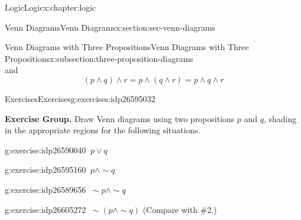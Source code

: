 \documentclass[twoside,10pt,]{book}
\numberwithin{equation}{section}
\begin{document}
\begin{chapterptx}{Logic}{}{Logic}{}{}{x:chapter:logic}
\begin{sectionptx}{Venn Diagrams}{}{Venn Diagrams}{}{}{x:section:sec-venn-diagrams}
\begin{subsectionptx}{Venn Diagrams with Three Propositions}{}{Venn Diagrams with Three Propositions}{}{}{x:subsection:three-proposition-diagrams}
\begin{equation*}
\end{equation*}
and%
\begin{equation*}
(p{\wedge} q){\wedge} r=p{\wedge}(q{\wedge} r)=p{\wedge} q{\wedge} r
\end{equation*}
%
\par
\begin{sidebyside}{2}{0.1}{0.1}{0}%
\begin{sbspanel}{0.4}%
%
\end{sbspanel}%
\begin{sbspanel}{0.4}%
%
\end{sbspanel}%
\end{sidebyside}%
%
\end{subsectionptx}
%
%
\typeout{************************************************}
\typeout{************************************************}
%
\begin{exercises-subsection}{Exercises}{}{Exercises}{}{}{g:exercises:idp26595032}
\par\medskip\noindent%
\textbf{Exercise Group.}\space\space%
Draw Venn diagrams using two propositions \(p\) and \(q\), shading in the appropriate regions for the following situations.\begin{exercisegroup}
\begin{divisionexerciseeg}{1}{}{}{g:exercise:idp26590040}%
\(\ p{\vee} q\)\end{divisionexerciseeg}%
\begin{divisionexerciseeg}{2}{}{}{g:exercise:idp26595160}%
\(\ p{\wedge} \sim\!{q}\)\end{divisionexerciseeg}%
\begin{divisionexerciseeg}{3}{}{}{g:exercise:idp26589656}%
\(\ \sim\!{p}{\wedge} \sim\!{q}\)\end{divisionexerciseeg}%
\begin{divisionexerciseeg}{4}{}{}{g:exercise:idp26605272}%
\(\ \sim\!(p{\wedge} \sim\!{q})\) (Compare with \#2.)\end{divisionexerciseeg}%

\end{exercisegroup}
\end{exercises-subsection}
\end{sectionptx}
\end{chapterptx}
\end{document}
